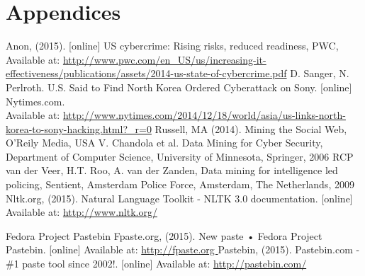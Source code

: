 \documentclass[12pt]{article}
\begin{document}
\section*{Appendices}
\newpage

\begin{thebibliography}{99}
	Anon, (2015). [online] US cybercrime: Rising risks, reduced readiness, PWC, Available at: \url{http://www.pwc.com/en_US/us/increasing-it-effectiveness/publications/assets/2014-us-state-of-cybercrime.pdf}
	 D. Sanger, N. Perlroth.  U.S. Said to Find North Korea Ordered Cyberattack on Sony. [online] Nytimes.com. \\Available at: \url{http://www.nytimes.com/2014/12/18/world/asia/us-links-north-korea-to-sony-hacking.html?_r=0}
  Russell, MA (2014). Mining the Social Web, O'Reily Media, USA
    V. Chandola et al. Data Mining for Cyber Security, Department of Computer Science, University of Minnesota, Springer, 2006
   RCP van der Veer, H.T. Roo,  A. van der Zanden, Data mining for intelligence led policing, Sentient, Amsterdam Police Force, Amsterdam, The Netherlands, 2009
Nltk.org, (2015). Natural Language Toolkit - NLTK 3.0 documentation. [online] Available at: \url{http://www.nltk.org/}

Fedora Project Pastebin Fpaste.org, (2015). New paste • Fedora Project Pastebin. [online] Available at:  
\url{http://fpaste.org }
Pastebin, (2015). Pastebin.com - \#1 paste tool since 2002!. [online] Available at:     \url{http://pastebin.com/}


\end{thebibliography}
\end{document}
